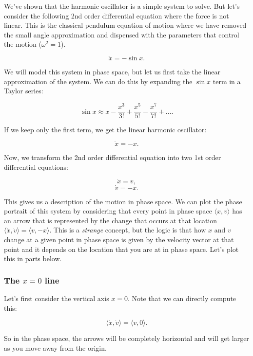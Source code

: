 \documentclass[11pt]{article}
\begin{document}
We've shown that the harmonic oscillator is a simple system to solve.
But let's consider the following 2nd order differential equation where
the force is not linear. This is the classical pendulum equation of
motion where we have removed the small angle approximation and dispensed
with the parameters that control the motion (\(\omega^2=1\)).

\[\ddot{x} = -\sin x.\]

We will model this system in phase space, but let us first take the
linear approximation of the system. We can do this by expanding the
\(\sin x\) term in a Taylor series:

\[\sin x \approx x - \dfrac{x^3}{3!} + \dfrac{x^5}{5!} - \dfrac{x^7}{7!} + \ldots.\]

If we keep only the first term, we get the linear harmonic oscillator:

\[\ddot{x} = -x.\]

Now, we transform the 2nd order differential equation into two 1st order
differential equations:

\[\dot{x} = v,\] \[\dot{v} = -x.\]

This gives us a description of the motion in phase space. We can plot
the phase portrait of this system by considering that every point in
phase space \(\langle x, v\rangle\) has an arrow that is represented by
the change that occurs at that location
\(\langle \dot{x}, \dot{v} \rangle = \langle v, -x\rangle\). This is a
\emph{strange} concept, but the logic is that how \(x\) and \(v\) change
at a given point in phase space is given by the velocity vector at that
point and it depends on the location that you are at in phase space.
Let's plot this in parts below.

\subsubsection{\texorpdfstring{The \(x=0\)
line}{The x=0 line}}\label{the-x0-line}

Let's first consider the vertical axis \(x=0\). Note that we can
directly compute this:

\[\langle \dot{x}, \dot{v} \rangle = \langle v,0 \rangle.\]

So in the phase space, the arrows will be completely horizontal and will
get larger as you move away from the origin.
\end{document}
